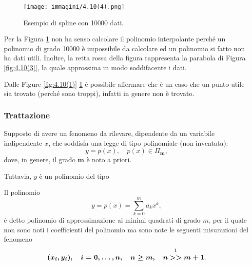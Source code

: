 \begin{figure}
    \centering
    \texttt{[image: immagini/4.10(4).png]}
    \caption{Esempio di spline con 10000 dati.}\label{fig:4.10(4)}
\end{figure}

Per la Figura \ref{fig:4.10(4)} non ha senso calcolare il polinomio interpolante perché un polinomio di grado 10000 è impossibile da calcolare ed un polinomio si fatto non ha dati utili. Inoltre, la retta rossa della figura rappresenta la parabola di Figura \ref{fig:4.10(3)}, la quale approssima in modo soddifacente i dati.

Dalle Figure \ref{fig:4.10(1)}-\ref{fig:4.10(4)} è possibile affermare che è un caso che un punto utile sia trovato (perché sono troppi), infatti in genere non è trovato. 

\subsubsection{Trattazione}
Supposto di avere un fenomeno da rilevare, dipendente da un variabile indipendente $x$, che soddisfa una legge di tipo polinomiale (non inventata):
\begin{equation*}
    y=p(x),\quad p(x)\in\Pi_{\boldsymbol{m}},
\end{equation*}
dove, in genere, il grado $\boldsymbol m$ è noto a priori.

Tuttavia, $y$ è un polinomio del tipo


\begin{definition}
	Il polinomio
	\begin{equation}\label{eq:polinomio_minimi_quadrati}
		y = p(x)=\sum_{k=0}^{m}a_kx^k,
	\end{equation}
	è detto polinomio di approssimazione ai minimi quadrati di grado $m$, per il quale non sono noti i coefficienti del polinomio ma sono note le seguenti misurazioni del fenomeno
	\begin{equation}\label{eq:misurazioni_fenomeno_minimo_quadrato}
		\boldsymbol{(x_i,y_i),\quad i=0,\hdots,n,\quad n\geq m,\quad n}\overset{\footnotemark}{\boldsymbol{>>}}\boldsymbol{m+1}.
	\end{equation}
\end{definition}

